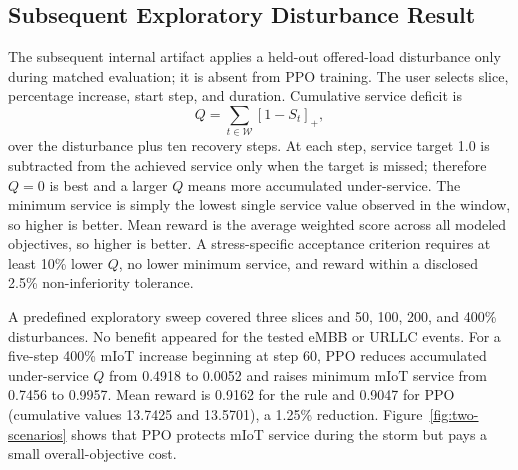 \documentclass[conference]{IEEEtran}
\begin{document}
\subsection{Subsequent Exploratory Disturbance Result}
The subsequent internal artifact \cite{ranslice16} applies a held-out offered-load disturbance only during matched evaluation; it is absent from PPO training. The user selects slice, percentage increase, start step, and duration. Cumulative service deficit is
\begin{equation}
Q=\sum_{t\in\mathcal{W}}[1-S_t]_+,
\end{equation}
over the disturbance plus ten recovery steps. At each step, service target 1.0 is subtracted from the achieved service only when the target is missed; therefore $Q=0$ is best and a larger $Q$ means more accumulated under-service. The minimum service is simply the lowest single service value observed in the window, so higher is better. Mean reward is the average weighted score across all modeled objectives, so higher is better. A stress-specific acceptance criterion requires at least 10\% lower $Q$, no lower minimum service, and reward within a disclosed 2.5\% non-inferiority tolerance.

A predefined exploratory sweep covered three slices and 50, 100, 200, and 400\% disturbances. No benefit appeared for the tested eMBB or URLLC events. For a five-step 400\% mIoT increase beginning at step 60, PPO reduces accumulated under-service $Q$ from 0.4918 to 0.0052 and raises minimum mIoT service from 0.7456 to 0.9957. Mean reward is 0.9162 for the rule and 0.9047 for PPO (cumulative values 13.7425 and 13.5701), a 1.25\% reduction. Figure~\ref{fig:two-scenarios} shows that PPO protects mIoT service during the storm but pays a small overall-objective cost.
\end{document}
